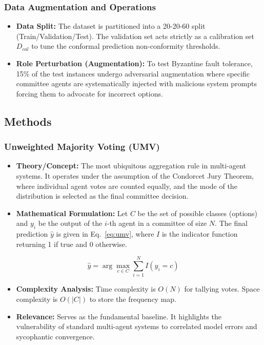 \documentclass[a4paper,fleqn]{cas-sc}
\begin{document}
\subsubsection{Data Augmentation and Operations}
\begin{itemize}
    \item \textbf{Data Split:} The dataset is partitioned into a 20-20-60 split (Train/Validation/Test). The validation set acts strictly as a calibration set $D_{cal}$ to tune the conformal prediction non-conformity thresholds.
    \item \textbf{Role Perturbation (Augmentation):} To test Byzantine fault tolerance, 15\% of the test instances undergo adversarial augmentation where specific committee agents are systematically injected with malicious system prompts forcing them to advocate for incorrect options.
\end{itemize}

\subsection{Methods}

\subsubsection{Unweighted Majority Voting (UMV)}
\begin{itemize}
    \item \textbf{Theory/Concept:} The most ubiquitous aggregation rule in multi-agent systems. It operates under the assumption of the Condorcet Jury Theorem, where individual agent votes are counted equally, and the mode of the distribution is selected as the final committee decision.
    \item \textbf{Mathematical Formulation:} Let $C$ be the set of possible classes (options) and $y_i$ be the output of the $i$-th agent in a committee of size $N$. The final prediction $\hat{y}$ is given in Eq.~\eqref{eq:umv}, where $I$ is the indicator function returning 1 if true and 0 otherwise.
\end{itemize}
\begin{equation}
    \hat{y} = \arg\max_{c \in C} \sum_{i=1}^{N} I(y_i = c)
    \label{eq:umv}
\end{equation}
\begin{itemize}
    \item \textbf{Complexity Analysis:} Time complexity is $O(N)$ for tallying votes. Space complexity is $O(\vert{}C\vert{})$ to store the frequency map.
    \item \textbf{Relevance:} Serves as the fundamental baseline. It highlights the vulnerability of standard multi-agent systems to correlated model errors and sycophantic convergence.
\end{itemize}
\end{document}
